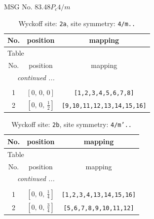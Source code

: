 \documentclass[fleqn,8pt]{jsarticle}
\begin{document}
\setcounter{MaxMatrixCols}{32}

\renewcommand{\tablename}{Table~}
\renewcommand{\figurename}{Figure~}
\begin{center}
\LARGE
MSG No. 83.48\quad$P_{c}4/m$
\end{center}
\renewcommand{\arraystretch}{1.2}
\begin{longtable}{ccc}
\caption{Wyckoff site: {\tt 2a}, site symmetry: {\tt 4/m..}}
 \\
 \hline \hline
No. & position & mapping \\ \hline \endfirsthead

\multicolumn{2}{l}{\tablename\ \thetable{}} \\
 \hline \hline
No. & position & mapping \\ \hline \endhead

 \hline \hline
\multicolumn{2}{r}{\footnotesize\it continued ...} \\ \endfoot

 \hline \hline
\multicolumn{2}{r}{} \\ \endlastfoot

1 & $\left[ 0,\, 0,\, 0 \right]$ & {\tt [1,2,3,4,5,6,7,8]} \\ \hline
2 & $\left[ 0,\, 0,\, \frac{1}{2} \right]$ & {\tt [9,10,11,12,13,14,15,16]} \\
\end{longtable}
\renewcommand{\arraystretch}{1.2}
\begin{longtable}{ccc}
\caption{Wyckoff site: {\tt 2b}, site symmetry: {\tt 4/m'..}}
 \\
 \hline \hline
No. & position & mapping \\ \hline \endfirsthead

\multicolumn{2}{l}{\tablename\ \thetable{}} \\
 \hline \hline
No. & position & mapping \\ \hline \endhead

 \hline \hline
\multicolumn{2}{r}{\footnotesize\it continued ...} \\ \endfoot

 \hline \hline
\multicolumn{2}{r}{} \\ \endlastfoot

1 & $\left[ 0,\, 0,\, \frac{1}{4} \right]$ & {\tt [1,2,3,4,13,14,15,16]} \\ \hline
2 & $\left[ 0,\, 0,\, \frac{3}{4} \right]$ & {\tt [5,6,7,8,9,10,11,12]} \\
\end{longtable}
\end{document}
